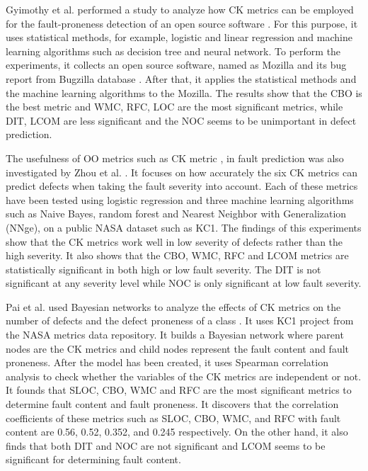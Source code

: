 \documentclass[12pt]{report}
\begin{document}
Gyimothy et al. performed a study to analyze how CK metrics can be employed for the fault-proneness detection of an open source software \cite{gyimothy2005empirical}. For this purpose, it uses statistical methods, for example, logistic and linear regression and machine learning algorithms such as decision tree and neural network. To perform the experiments, it collects an open source software, named as Mozilla and its bug report from Bugzilla database \cite{BugzillaforMozilla}. After that, it applies the statistical methods and the machine learning algorithms to the Mozilla. The results show that the CBO is the best metric and WMC, RFC, LOC are the most significant metrics, while DIT, LCOM are less significant and the NOC seems to be unimportant in defect prediction.

The usefulness of OO metrics such as CK metric \cite{chidamber1994metrics}, in fault prediction was also investigated by Zhou et al. \cite{zhou2006empirical}. It focuses on how accurately the six CK metrics can predict defects when taking the fault severity into account. Each of these metrics have been tested using logistic regression and three machine learning algorithms such as Naive Bayes, random forest and Nearest Neighbor with Generalization (NNge), on a public NASA dataset such as KC1. The findings of this experiments show that the CK metrics work well in low severity of defects rather than the high severity. It also shows that the CBO, WMC, RFC and LCOM metrics are statistically significant in both high or low fault severity. The DIT is not significant at any severity level while NOC is only significant at low fault severity. 

Pai et al. used Bayesian networks to analyze the effects of CK metrics \cite{chidamber1994metrics} on the number of defects and the defect proneness of a class \cite{pai2007empirical}. It uses KC1 project from the NASA metrics data repository. It builds a Bayesian network where parent nodes are the CK metrics \cite{chidamber1994metrics} and child nodes represent the fault content and fault proneness. After the model has been created, it uses  Spearman correlation analysis \cite{cohen2013applied} to check whether the variables of the CK metrics are independent or not. It founds that SLOC, CBO, WMC and RFC are the most significant metrics to determine fault content and fault proneness. It discovers that the correlation coefficients of these metrics such as SLOC, CBO, WMC, and RFC with fault content are 0.56, 0.52, 0.352, and 0.245 respectively. On the other hand, it also finds that both DIT and NOC are not significant and LCOM seems to be significant for determining fault content.
   
\end{document}
